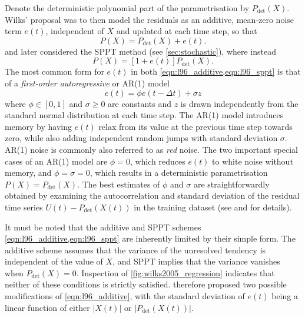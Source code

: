 \documentclass[titlepage,twoside]{article}
\numberwithin{equation}{section}
\begin{document}
Denote the deterministic polynomial part of the parametrisation by
$P_\mathrm{det}(X)$. Wilks' proposal was to then model the residuals as an
additive, mean-zero noise term $e(t)$, independent of $X$ and updated at each
time step, so that
\begin{equation} \label{eqn:l96_additive}
    P(X) = P_\mathrm{det}(X) + e(t).
\end{equation}
\textcite{arnold2013} and later \textcite{christensen2015} considered the SPPT
method (see \cref{sec:stochastic}), where instead
\begin{equation} \label{eqn:l96_sppt}
    P(X) = [1 + e(t)] P_\mathrm{det}(X).
\end{equation}
The most common form for $e(t)$ in both \cref{eqn:l96_additive,eqn:l96_sppt} is
that of a \emph{first-order autoregressive} or AR(1) model
\begin{equation} \label{eqn:ar1}
    e(t) = \phi e(t - \Delta t) + \sigma z
\end{equation}
where $\phi \in [0,1]$ and $\sigma  \geq 0$ are constants and $z$ is drawn
independently from the standard normal distribution at each time step. The
AR(1) model introduces memory by having $e(t)$ relax from its value at the
previous time step towards zero, while also adding independent random jumps
with standard deviation $\sigma$. AR(1) noise is commonly also referred to as
\emph{red} noise. The two important special cases of an AR(1) model are $\phi =
0$, which reduces $e(t)$ to white noise without memory, and $\phi = \sigma =
0$, which results in a deterministic parametrisation $P(X) =
P_\mathrm{det}(X)$. The best estimates of $\phi$ and $\sigma$ are
straightforwardly obtained by examining the autocorrelation and standard
deviation of the residual time series $U(t) - P_\mathrm{det}(X(t))$ in the
training dataset (see \textcite{arnold2013} and \textcite[Chapter 9]{wilks2011}
for details).

It must be noted that the additive and SPPT schemes
\cref{eqn:l96_additive,eqn:l96_sppt} are inherently limited by their simple
form. The additive scheme assumes that the variance of the unresolved tendency
is independent of the value of $X$, and SPPT implies that the variance vanishes
when $P_\mathrm{det}(X)=0$. Inspection of \cref{fig:wilks2005_regression}
indicates that neither of these conditions is strictly satisfied.
\textcite{arnold2013} therefore proposed two possible modifications of
\cref{eqn:l96_additive}, with the standard deviation of $e(t)$ being a linear
function of either $|X(t)|$ or $|P_\mathrm{det}(X(t))|$.
\end{document}
